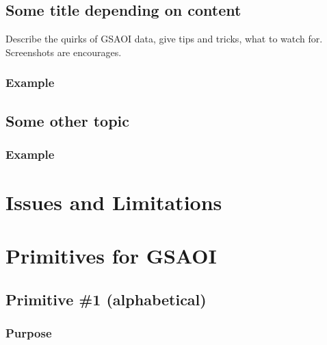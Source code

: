 \documentclass[letterpaper,10pt,english]{sphinxmanual}
\begin{document}
\subsection{Some title depending on content}
\label{GSAOI/tipstricks:some-title-depending-on-content}
Describe the quirks of GSAOI data, give tips
and tricks, what to watch for.  Screenshots are encourages.


\subsubsection{Example}
\label{GSAOI/tipstricks:example}

\subsection{Some other topic}
\label{GSAOI/tipstricks:some-other-topic}

\subsubsection{Example}
\label{GSAOI/tipstricks:id1}

\section{Issues and Limitations}
\label{GSAOI/issueslimitations:gsaoi-issues-limitations}\label{GSAOI/issueslimitations::doc}\label{GSAOI/issueslimitations:issues-and-limitations}

\section{Primitives for GSAOI}
\label{GSAOI/primitives:primitives-for-gsaoi}\label{GSAOI/primitives::doc}\label{GSAOI/primitives:gsaoi-primitives}

\subsection{Primitive \#1  (alphabetical)}
\label{GSAOI/primitives_pages/primitive1:gsaoi-primitive-1}\label{GSAOI/primitives_pages/primitive1:primitive-1-alphabetical}\label{GSAOI/primitives_pages/primitive1::doc}

\subsubsection{Purpose}
\label{GSAOI/primitives_pages/primitive1:purpose}
\end{document}
